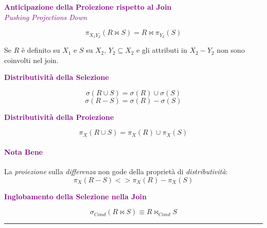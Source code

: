 \begin{center}
    \textbf{\textcolor{purple}{Anticipazione della Proiezione rispetto al Join}} \\
    \emph{\textcolor{purple}{Pushing Projections Down}}
\end{center}
\begin{equation}
    \pi_{X_1Y_2}(R \bowtie S) = R \bowtie \pi_{Y_2}(S)
\end{equation}
\begin{center}
    Se $R$ è definito su $X_1$ e $S$ su $X_2$, $Y_2 \subseteq X_2$ e gli attributi
    in $X_2 - Y_2$ non sono coinvolti nel join.
\end{center}

\begin{center}
    \textbf{\textcolor{purple}{Distributività della Selezione}}
\end{center}
\begin{equation}
    \sigma(R \cup S) = \sigma(R) \cup \sigma(S)
\end{equation}
\begin{equation}
    \sigma(R - S) = \sigma(R) - \sigma(S)
\end{equation}

\begin{center}
    \textbf{\textcolor{purple}{Distributività della Proiezione}}
\end{center}
\begin{equation}
    \pi_{X}(R \cup S) = \pi_{X}(R) \cup \pi_{X}(S)
\end{equation}
\paragraph{\textcolor{purple}{Nota Bene}} La \emph{proiezione} sulla \emph{differenza}
non gode della proprietà di \emph{distributività}:
\begin{equation}
    \pi_{X}(R - S) <> \pi_{X}(R) - \pi_{X}(S)
\end{equation}

\begin{center}
    \textbf{\textcolor{purple}{Inglobamento della Selezione nella Join}}
\end{center}
\begin{equation}
    \sigma_{Cond}(R \bowtie S) \equiv R \bowtie_{Cond} S
\end{equation}

\par\noindent\rule{\textwidth}{0.5pt}
\par

